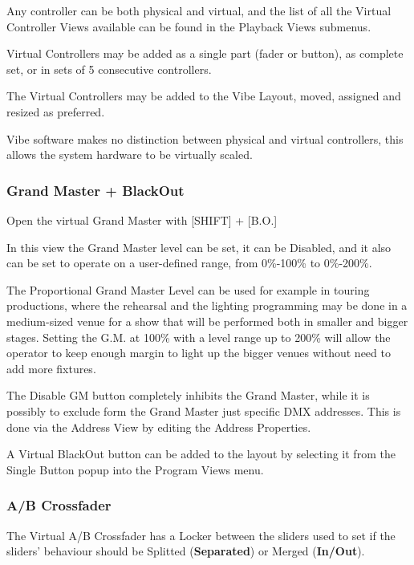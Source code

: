 \documentclass[
]{article}
\begin{document}
Any controller can be both physical and virtual, and the list of all the Virtual Controller Views available can be found in the Playback Views submenus.

Virtual Controllers may be added as a single part (fader or button), as complete set, or in sets of 5 consecutive controllers.

The Virtual Controllers may be added to the Vibe Layout, moved, assigned and resized as preferred.

Vibe software makes no distinction between physical and virtual controllers, this allows the system hardware to be virtually scaled.

\hypertarget{grand-master-blackout-1}{%
\subsubsection{Grand Master + BlackOut}\label{grand-master-blackout-1}}

Open the virtual Grand Master with {[}SHIFT{]} + {[}B.O.{]}

In this view the Grand Master level can be set, it can be Disabled, and it also can be set to operate on a user-defined range, from 0\%-100\% to 0\%-200\%.

The Proportional Grand Master Level can be used for example in touring productions, where the rehearsal and the lighting programming may be done in a medium-sized venue for a show that will be performed both in smaller and bigger stages. Setting the G.M. at 100\% with a level range up to 200\% will allow the operator to keep enough margin to light up the bigger venues without need to add more fixtures.

The Disable GM button completely inhibits the Grand Master, while it is possibly to exclude form the Grand Master just specific DMX addresses. This is done via the Address View by editing the Address Properties.

A Virtual BlackOut button can be added to the layout by selecting it from the Single Button popup into the Program Views menu.

\hypertarget{ab-crossfader-1}{%
\subsubsection{A/B Crossfader}\label{ab-crossfader-1}}

The Virtual A/B Crossfader has a Locker between the sliders used to set if the sliders' behaviour should be Splitted (\textbf{Separated}) or Merged (\textbf{In/Out}).
\end{document}
